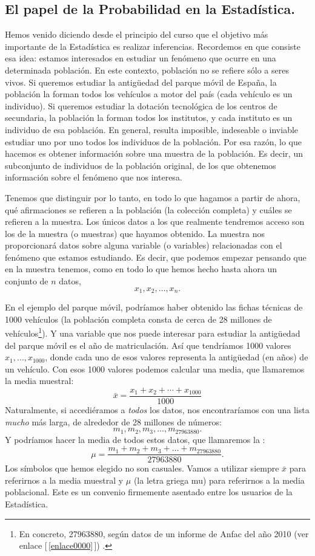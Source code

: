 \subsection*{El papel de la Probabilidad en la Estadística.}

Hemos venido diciendo desde el principio del curso que el objetivo más importante de la Estadística
es realizar inferencias. Recordemos en que consiste esa idea: estamos interesados en estudiar un
fenómeno que ocurre en una determinada  {\sf población}. En este contexto,
población no se refiere sólo a seres vivos. Si queremos estudiar la antigüedad del parque móvil de
España, la población la forman todos los vehículos a motor del país (cada vehículo es un
individuo). Si queremos estudiar la dotación tecnológica de los centros de secundaria, la población
la forman todos los institutos, y cada instituto es un individuo de esa población. En general,
resulta imposible, indeseable o inviable estudiar uno por uno todos los individuos de la población.
Por esa razón, lo que hacemos es obtener información sobre una {\sf muestra} de la población. Es
decir, un subconjunto de individuos de la población original, de los que obtenemos información
sobre el fenómeno que nos interesa.

Tenemos que distinguir por lo tanto, en todo lo que hagamos a partir de ahora, qué afirmaciones se
refieren a la población (la colección completa) y cuáles se refieren a la muestra. Los únicos datos
a los que realmente tendremos acceso son los de la muestra (o muestras) que hayamos obtenido. La
muestra nos proporcionará datos sobre alguna variable (o variables) relacionadas con el fenómeno
que estamos estudiando. Es decir, que podemos empezar pensando que en la muestra tenemos, como en
todo lo que hemos hecho hasta ahora un conjunto de $n$ datos,
        \[x_1,x_2,\ldots,x_n.\]

En el ejemplo del parque móvil, podríamos haber obtenido las fichas técnicas de 1000 vehículos (la
población completa consta de cerca de 28 millones de vehículos\footnote{En concreto, 27963880,
según datos de un informe de Anfac del año 2010 (ver enlace  [\,\ref{enlace0000}\,]\label{enlace0000a}) .}). Y una variable que nos puede interesar
para estudiar la antigüedad del parque móvil es el año de matriculación. Así que tendríamos 1000
valores $x_1,\ldots,x_{1000}$, donde cada uno de esos valores representa la antigüedad (en años) de
un vehículo. Con esos 1000 valores podemos calcular una media, que llamaremos la  {\sf media muestral}:
    \[\bar x=\dfrac{x_1+x_2+\cdots+x_{1000}}{1000}\]
Naturalmente, si accediéramos a {\em todos} los datos, nos encontraríamos con una lista {\em mucho}
más larga, de alrededor de 28 millones de números:
    \[m_1,m_2,m_3,\ldots,m_{27963880}.\]
Y podríamos hacer la media de todos estos datos, que llamaremos la :
    \[\mu=\dfrac{m_1+m_2+m_3+\ldots+m_{27963880}}{27963880}.\]
Los símbolos que hemos elegido no son casuales. Vamos a utilizar siempre $\bar x$ para referirnos a
la media muestral y $\mu$ (la letra griega mu) para referirnos a la media poblacional. Este es un
convenio firmemente asentado entre los usuarios de la Estadística.

